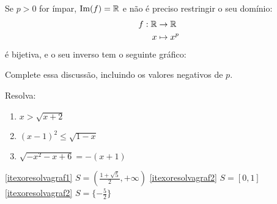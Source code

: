 Se $p>0$ for ímpar, $\operatorname{Im}(f)=\mathbb{R}$ e não é preciso restringir o seu domínio: 
\begin{align*}
 f:\mathbb{R} &\to \mathbb{R}\\
x&\mapsto x^p
\end{align*}
é bijetiva, e o seu inverso tem o seguinte gráfico:
\begin{center}
\begin{bmlimage}\end{bmlimage}
\end{center}


\begin{exo}
Complete essa discussão, incluindo os valores negativos de $p$.
\end{exo}

\begin{exo}
Resolva:
\begin{multicols}{3}
\begin{enumerate}
\item\label{itexoresolvagraf1} $x>\sqrt{x+2}$
\item\label{itexoresolvagraf2} $(x-1)^2\leq \sqrt{1-x}$
\item\label{itexoresolvagraf3} $\sqrt{-x^2-x+6}=-(x+1)$
\end{enumerate}
\vspace{0.04cm}
\end{multicols}
\begin{sol}
\ref{itexoresolvagraf1} $S=(\frac{1+\sqrt{5}}{2},+\infty)$
\ref{itexoresolvagraf2} $S=[0,1]$
\ref{itexoresolvagraf2} $S=\{-\tfrac52\}$
\end{sol}
\end{exo}

